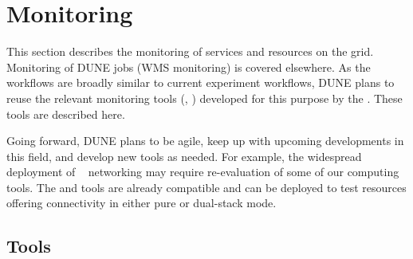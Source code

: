 \documentclass[../main-v1.tex]{subfiles}
\begin{document}
\chapter{Monitoring }
\label{ch:mon}

\FPadd\MonEtfTotalPeople\MonEtfOpsPeople\MonEtfDevPeople %

This section %
describes the monitoring of services and resources on the grid. %
Monitoring of DUNE jobs (WMS monitoring) is covered elsewhere.  As the workflows are broadly similar to current  experiment workflows, DUNE plans to reuse the relevant monitoring tools (, ) developed for this purpose by the . %
These tools are described here. 

Going forward, DUNE plans to be agile, keep up with upcoming developments in this field, and develop new tools as needed. For example, the widespread deployment of ~\cite{bib:ipv6TaskForce} networking may require re-evaluation of some of our computing tools.  The  and  tools are already  compatible and can be deployed to test resources offering  connectivity in either pure or dual-stack mode.

\section{Tools}
\label{sec:mon:xyz}  %
\end{document}
